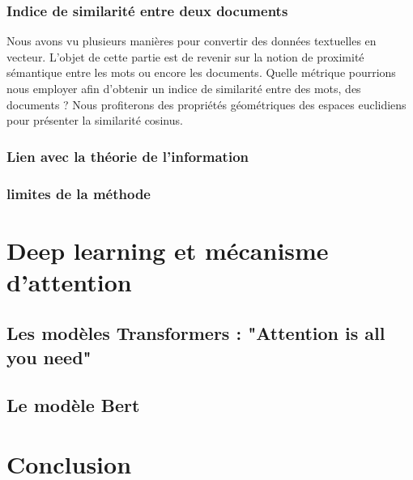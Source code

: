 \documentclass[12pt]{article}
\theoremstyle{definition}
\begin{document}
	\subsubsection{Indice de similarité entre deux documents}
	Nous avons vu plusieurs manières pour convertir des données textuelles en vecteur. L'objet de cette partie est de revenir sur la notion de proximité sémantique entre les mots ou encore les documents. Quelle métrique pourrions nous employer afin d'obtenir un indice de similarité entre des mots, des documents ? Nous profiterons des propriétés géométriques des espaces euclidiens pour présenter la similarité cosinus. 
	\subsubsection{Lien avec la théorie de l'information}
	
	\subsubsection{limites de la méthode}
	
	
	\section{Deep learning et mécanisme d'attention}
	
	\subsection{Les modèles Transformers : "Attention is all you need"}
	\subsection{Le modèle Bert}
	
	
	\section{Conclusion}
	
	
	
	
\end{document}
